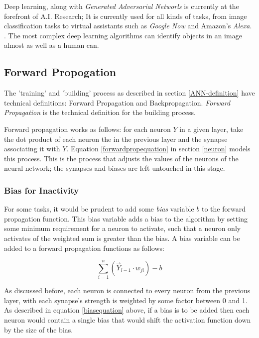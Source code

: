 \documentclass[12pt]{article}
\begin{document}
Deep learning, along with \textit{Generated Adversarial Networls} is currently at the forefront of A.I. Research; It is currently used for all kinds of tasks, from image classification tasks to virtual assistants such as \textit{Google Now} and Amazon's \textit{Alexa}. \textcite{vazquez17}. The most complex deep learning algorithms can identify objects in an image almost as well as a human can.

\subsection{Forward Propogation \label{foreprop}}

The 'training' and 'building' process as described in section \ref{ANN-definition} have technical definitions: Forward Propagation and Backpropagation. \textit{Forward Propagation} is the technical definition for the building process.

Forward propagation works as follows: for each neuron \(Y\) in a given layer, take the dot product of each neuron the in the previous layer and the synapse associating it with \(Y\). Equation \ref{forwardpropequation} in section \ref{neuron} models this process. This is the process that adjusts the values of the neurons of the neural network; the synapses and biases are left untouched in this stage.

\subsubsection{Bias for Inactivity}
For some tasks, it would be prudent to add some \textit{bias} variable \(b\) to the forward propagation function. This bias variable adds a bias to the algorithm by setting some minimum requirement for a neuron to activate, such that a neuron only activates of the weighted sum is greater than the bias. A bias variable can be added to a forward propagation functions as follows:

\begin{equation} \label{biasequation}
  \sum_{i=1}^{n}(\vec Y_{l-1} \cdot w_{ji}) -b
\end{equation}

As discussed before, each neuron is connected to every neuron from the previous layer, with each synapse's strength is weighted by some factor between 0 and 1. As described in equation \ref{biasequation} above, if a bias is to be added then each neuron would contain a single bias that would shift the activation function down by the size of the bias.
\end{document}
